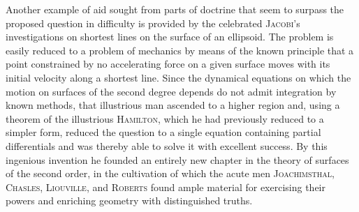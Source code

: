 \documentclass[11pt]{article}
\newcommand{\scn}[1]{\textsc{#1}}
\begin{document}
Another example of aid sought from parts of doctrine that seem to surpass the proposed question in difficulty is provided by the celebrated \scn{Jacobi}'s investigations on shortest lines on the surface of an ellipsoid. The problem is easily reduced to a problem of mechanics by means of the known principle that a point constrained by no accelerating force on a given surface moves with its initial velocity along a shortest line. Since the dynamical equations on which the motion on surfaces of the second degree depends do not admit integration by known methods, that illustrious man ascended to a higher region and, using a theorem of the illustrious \scn{Hamilton}, which he had previously reduced to a simpler form, reduced the question to a single equation containing partial differentials and was thereby able to solve it with excellent success. By this ingenious invention he founded an entirely new chapter in the theory of surfaces of the second order, in the cultivation of which the acute men \scn{Joachimsthal}, \scn{Chasles}, \scn{Liouville}, and \scn{Roberts} found ample material for exercising their powers and enriching geometry with distinguished truths.
\end{document}
